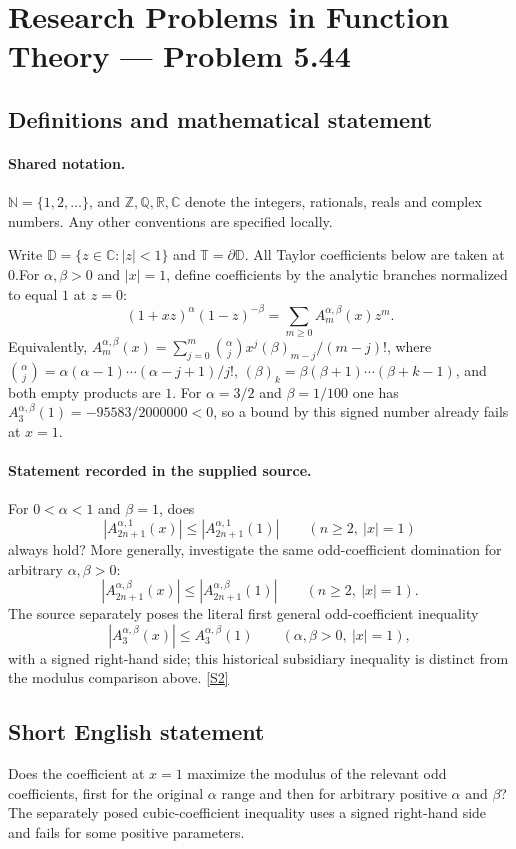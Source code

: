 \documentclass[11pt]{article}
\newcommand{\sref}[2]{\hyperlink{source:#1:#2}{[S#2]}}
\begin{document}
\section{Research Problems in Function Theory — Problem 5.44}\label{statement}

\subsection{Definitions and mathematical statement}

\paragraph{Shared notation.}$\mathbb N=\{1,2,\ldots\}$, and $\mathbb Z,\mathbb Q,\mathbb R,\mathbb C$ denote the integers, rationals, reals and complex numbers. Any other conventions are specified locally.


Write $\mathbb D=\{z\in\mathbb C:|z|<1\}$ and $\mathbb T=\partial\mathbb D$. All Taylor coefficients below are taken at $0$.For $\alpha,\beta>0$ and $|x|=1$, define coefficients by the analytic branches normalized to equal $1$ at $z=0$:
\[(1+xz)^\alpha(1-z)^{-\beta}=\sum_{m\ge0}A_m^{\alpha,\beta}(x)z^m.
\]
Equivalently, $A_m^{\alpha,\beta}(x)=\sum_{j=0}^m\binom\alpha j x^j(\beta)_{m-j}/(m-j)!$, where $\binom\alpha j=\alpha(\alpha-1)\cdots(\alpha-j+1)/j!$, $(\beta)_k=\beta(\beta+1)\cdots(\beta+k-1)$, and both empty products are $1$. For $\alpha=3/2$ and $\beta=1/100$ one has $A_3^{\alpha,\beta}(1)=-95583/2000000<0$, so a bound by this signed number already fails at $x=1$.
\paragraph{Statement recorded in the supplied source.}
For $0<\alpha<1$ and $\beta=1$, does
\[|A_{2n+1}^{\alpha,1}(x)|\le |A_{2n+1}^{\alpha,1}(1)|\qquad(n\ge2,\ |x|=1)\]
always hold? More generally, investigate the same odd-coefficient domination for arbitrary $\alpha,\beta>0$:
\[|A_{2n+1}^{\alpha,\beta}(x)|\le |A_{2n+1}^{\alpha,\beta}(1)|\qquad(n\ge2,\ |x|=1).\]
The source separately poses the literal first general odd-coefficient inequality
\[|A_3^{\alpha,\beta}(x)|\le A_3^{\alpha,\beta}(1)\qquad(\alpha,\beta>0,\ |x|=1),\]
with a signed right-hand side; this historical subsidiary inequality is distinct from the modulus comparison above. \sref{statement}{2}
\subsection{Short English statement}
Does the coefficient at $x=1$ maximize the modulus of the relevant odd coefficients, first for the original $\alpha$ range and then for arbitrary positive $\alpha$ and $\beta$? The separately posed cubic-coefficient inequality uses a signed right-hand side and fails for some positive parameters.
\end{document}
